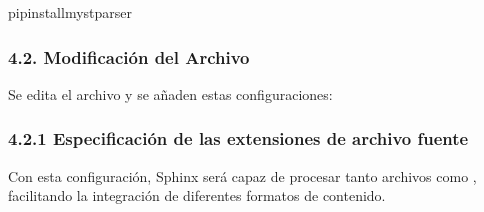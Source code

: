 \documentclass[a4paper,10pt,oneside,spanish,openany]{sphinxmanual}
\begin{document}
\begin{sphinxVerbatim}[commandchars=\\\{\}]
pipinstallmyst\PYGZhy{}parser
\end{sphinxVerbatim}


\subsubsection{4.2. Modificación del Archivo }
\label{\detokenize{configuracion_inicial/003.Creacion_proyecto_Sphinx:modificacion-del-archivo-conf-py}}
\sphinxAtStartPar
Se edita el archivo  y se añaden estas configuraciones:

\begin{sphinxVerbatim}[commandchars=\\\{\}]
  \PYG{p}{[}
      
\PYG{p}{]}
\end{sphinxVerbatim}


\subsubsection{4.2.1 Especificación de las extensiones de archivo fuente}
\label{\detokenize{configuracion_inicial/003.Creacion_proyecto_Sphinx:especificacion-de-las-extensiones-de-archivo-fuente}}
\begin{sphinxVerbatim}[commandchars=\\\{\}]
  
       
       
\end{sphinxVerbatim}

\sphinxAtStartPar
Con esta configuración, Sphinx será capaz de procesar tanto archivos  como , facilitando la integración de diferentes formatos de contenido.
\end{document}
